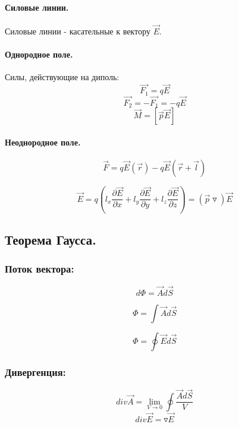 \documentclass{article}
\begin{document}
    \paragraph{Силовые линии.} Силовые линии - касательные к вектору $\overrightarrow{E}$.
  
    \paragraph{Однородное поле.} Силы, действующие на диполь: 
    $$ \overrightarrow{F_1} = q\overrightarrow{E} $$
    $$ \overrightarrow{F_2} = -\overrightarrow{F_1} = -q\overrightarrow{E} $$
    $$ \overrightarrow{M} = [\overrightarrow{p}\overrightarrow{E}] $$
  
    \paragraph{Неоднородное поле.}
    $$ \overrightarrow{F} = q\overrightarrow{E}(\overrightarrow{r}) - q\overrightarrow{E}(\overrightarrow{r} + \overrightarrow{l}) $$
  
    $$ \overrightarrow{E}= q \left(l_x \frac{\partial\overrightarrow{E}}{\partial x} + l_y \frac{\partial\overrightarrow{E}}{\partial y} + l_z \frac{\partial\overrightarrow{E}}{\partial z} \right)  = \left(\overrightarrow{p}\triangledown\right)\overrightarrow{E} $$ 

    \subsection*{Теорема Гаусса.}
    
    \subsubsection*{Поток вектора:}
    $$ d\Phi = \overrightarrow{A} d\overrightarrow{S} $$
  
    $$ \Phi = \int \overrightarrow{A}d\overrightarrow{S} $$
  
    $$ \Phi = \oint \overrightarrow{E}d\overrightarrow{S} $$    
    
    \subsubsection*{Дивергенция:}
    $$ div \overrightarrow{A} = \lim \limits_{V \rightarrow 0} \oint \frac{\overrightarrow{A}d\overrightarrow{S}}{V} $$
    $$ div \overrightarrow{E} = \triangledown \overrightarrow{E} $$ 
    
\end{document}
